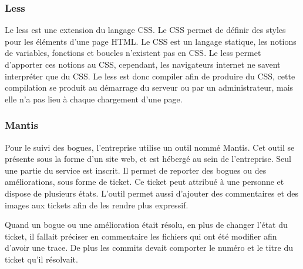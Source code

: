 \documentclass[12pt,a4paper]{article}
\begin{document}
\subsubsection{Less}
Le less est une extension du langage CSS. Le CSS permet de définir des styles pour les éléments d'une page HTML. Le CSS est un langage statique, les notions de variables, fonctions et boucles n'existent pas en CSS. Le less permet d'apporter ces notions au CSS, cependant, les navigateurs internet ne savent interpréter que du CSS. Le less est donc compiler afin de produire du CSS, cette compilation se produit au démarrage du serveur ou par un administrateur, mais elle n'a pas lieu à chaque chargement d'une page.

\subsubsection{Mantis}
Pour le suivi des bogues, l'entreprise utilise un outil nommé Mantis. Cet outil se présente sous la forme d'un site web, et est hébergé au sein de l'entreprise. Seul une partie du service est inscrit. Il permet de reporter des bogues ou des améliorations, sous forme de ticket. Ce ticket peut attribué à une personne et dispose de plusieurs états. L'outil permet aussi d'ajouter des commentaires et des images aux tickets afin de les rendre plus expressif.\par 
Quand un bogue ou une amélioration était résolu, en plus de changer l'état du ticket, il fallait préciser en commentaire les fichiers qui ont été modifier afin d'avoir une trace. De plus les commits devait comporter le numéro et le titre du ticket qu'il résolvait.\par
\end{document}
